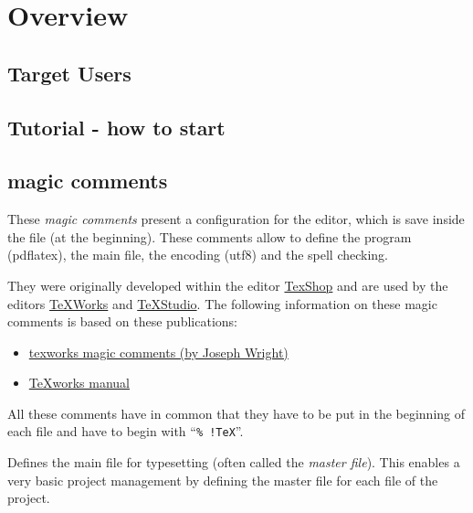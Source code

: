 \chapter{Overview}

\section{Target Users}
%
\section{Tutorial - how to start}

\section{magic comments}

These \emph{magic comments} present a configuration for the editor, which is save inside the \latex file (at the beginning). These comments allow to define the program (pdflatex), the main file, the encoding (utf8) and the spell checking. 

They were originally developed within the editor \href{http://pages.uoregon.edu/koch/texshop/index.html}{TexShop} and are used by the editors \href{http://www.tug.org/texworks/}{TeXWorks} and \href{http://texstudio.sourceforge.net/}{TeXStudio}.
%
The following information on these magic comments is based on these publications:
%
\begin{itemize}[noitemsep]
\item \href{http://www.texdev.net/2011/03/24/texworks-magic-comments/} %
      {texworks magic comments (by Joseph Wright)}
\item \href{http://ftp.ctex.org/pub/tex/tools/editors/TeXworks/manual.pdf}%
      {TeXworks manual}
\end{itemize}
%
All these comments have in common that they have to be put in the beginning of each file and have to begin with \enquote{\texttt{\% !TeX}}. 

\begin{latexcode}
\end{latexcode}
%
Defines the main file for typesetting (often called the \emph{master file}). This enables a very basic project management by defining the master file for each file of the project.

